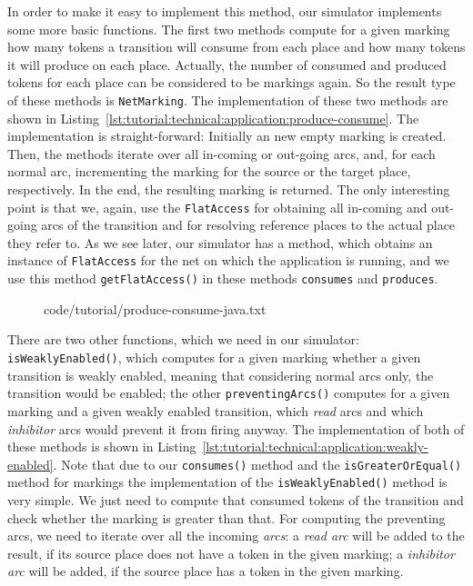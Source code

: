 In order to make it easy to implement this method, our
simulator implements some more basic functions. The first two methods compute
for a given marking how many tokens a transition will consume from each place
and how many tokens it will produce on each place. Actually, the number of
consumed and produced tokens for each place can be considered to be markings
again. So the result type of these methods is {\tt NetMarking}. The
implementation of these two methods are shown in
Listing~\ref{lst:tutorial:technical:application:produce-consume}.
The implementation is straight-forward: Initially an new empty marking is
created. Then, the methods iterate over all in-coming or out-going
arcs, and, for each normal arc, incrementing the marking for the source
or the target place, respectively. In the end, the resulting marking is
returned.
The only interesting point is that we, again, use the {\tt FlatAccess} for
obtaining all in-coming and out-going arcs of the transition and for resolving reference
places to the actual place they refer to. As we see later, our simulator
has a method, which obtains an instance of {\tt FlatAccess} for the net on
which the application is running, and we use this method {\tt getFlatAccess()}
in these methods {\tt consumes} and  {\tt produces}.

\begin{figure}[htbp!]
%
  {code/tutorial/produce-consume-java.txt}
\end{figure} 

There are two other functions, which we need in our simulator: {\tt
isWeakly\optsep{}Enabled()}, which computes for a given marking whether a given
transition is weakly enabled, meaning that considering normal arcs only, the transition
would be enabled; the other {\tt preventingArcs()} computes for a given marking
and a given weakly enabled transition, which \emph{read} arcs and which
\emph{inhibitor} arcs would prevent it from firing anyway. The implementation
of both of these methods is shown in
Listing~\ref{lst:tutorial:technical:application:weakly-enabled}. Note that due
to our {\tt consumes()} method and the {\tt isGreaterOrEqual()} method for
markings the implementation of the {\tt isWeaklyEnabled()} method is very
simple. We just need to compute that consumed tokens of the transition and
check whether the marking is greater than that. For computing the preventing
arcs, we need to iterate over all the incoming \emph{arcs}: a \emph{read arc}
will be added to the result, if its source place does not have a token in the
given marking; a \emph{inhibitor arc} will be added, if the source place has a
token in the given marking.

